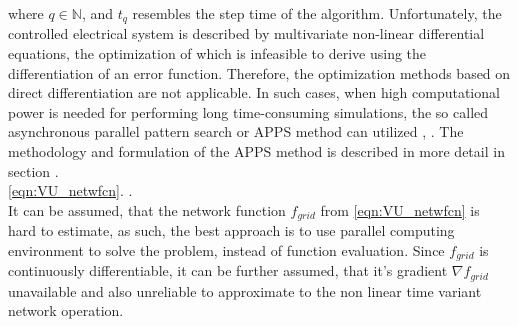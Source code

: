        where $q\in\mathbb{N}$, and $t_q$ resembles the step time of the algorithm. Unfortunately, the controlled electrical system is described by multivariate non-linear differential equations, the optimization of which is infeasible to derive using the differentiation of an error function. Therefore, the optimization methods based on direct differentiation are not applicable. In such cases, when high computational power is needed for performing long time-consuming simulations, the so called asynchronous parallel pattern search or APPS method can utilized \cite{hough2001asynchronous}, \cite{kolda2003understanding}. The methodology and formulation of the APPS method is described in more detail in section .\\
          \ref{eqn:VU_netwfcn}.  \cite{el2011active}.\\
        It can be assumed, that the network function $f_{grid}$ from \ref{eqn:VU_netwfcn} is hard to estimate, as such, the best approach is to use parallel computing environment to solve the problem, instead of function evaluation. Since $f_{grid}$ is continuously differentiable, it can be further assumed, that it's gradient $\nabla f_{grid}$ unavailable and also unreliable to approximate to the non linear time variant network operation.\\ %

